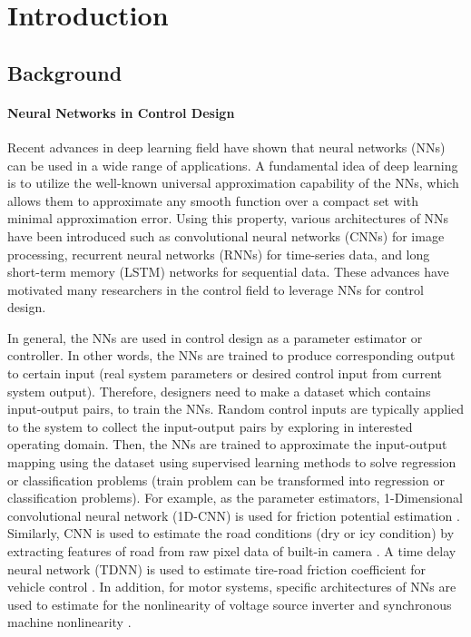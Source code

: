 

\chapter{Introduction}

\section{Background} 

\subsubsection{Neural Networks in Control Design}

Recent advances in deep learning field have shown that neural networks (NNs) can be used in a wide range of applications. 
A fundamental idea of deep learning is to utilize the well-known universal approximation capability of the NNs, which allows them to approximate any smooth function over a compact set with minimal approximation error. 
Using this property, various architectures of NNs have been introduced such as convolutional neural networks (CNNs) for image processing, recurrent neural networks (RNNs) for time-series data, and long short-term memory (LSTM) networks for sequential data. 
These advances have motivated many researchers in the control field to leverage NNs for control design.

In general, the NNs are used in control design as a parameter estimator or controller.
In other words, the NNs are trained to produce corresponding output to certain input (\ie real system parameters or desired control input from current system output).
Therefore, designers need to make a dataset which contains input-output pairs, to train the NNs.
Random control inputs are typically applied to the system to collect the input-output pairs by exploring in interested operating domain.
Then, the NNs are trained to approximate the input-output mapping using the dataset using supervised learning methods to solve regression or classification problems (\ie train problem can be transformed into regression or classification problems).
For example, as the parameter estimators, 1-Dimensional convolutional neural network (1D-CNN) is used for friction potential estimation \cite{RN109}.
Similarly, CNN is used to estimate the road conditions (\eg dry or icy condition) by extracting features of road from raw pixel data of built-in camera \cite{RN118}.
A time delay neural network (TDNN) is used to estimate tire-road friction coefficient for vehicle control \cite{RN107}.
In addition, for motor systems, specific architectures of NNs are used to estimate for the nonlinearity of voltage source inverter and synchronous machine nonlinearity \cite{RN115}.

